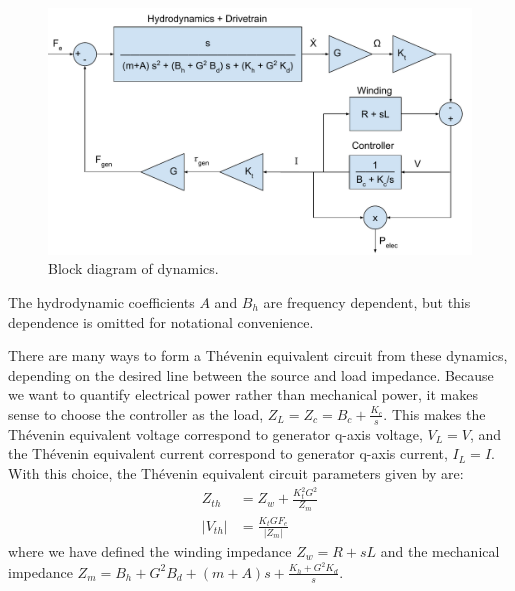 \documentclass{ifacconf}
\begin{document}
\begin{figure}
    \centering
    \includegraphics[width=\linewidth]{ifacconf_latex/figs/IFAC CAMS Dynamics Diagram - Electrical Control.pdf}
    \caption{Block diagram of dynamics.}
    \label{fig:block-diagram-dynamics}
\end{figure}
The hydrodynamic coefficients $A$ and $B_h$ are frequency dependent, but this dependence is omitted for notational convenience.

There are many ways to form a Thévenin equivalent circuit from these dynamics, depending on the desired line between the source and load impedance. Because we want to quantify electrical power rather than mechanical power, it makes sense to choose the controller as the load, $Z_L = Z_c = B_c + \frac{K_c}{s}$. This makes the Thévenin equivalent voltage correspond to generator q-axis voltage, $V_L = V$, and the Thévenin equivalent current correspond to generator q-axis current, $I_L = I$. With this choice, the Thévenin equivalent circuit parameters given by \cite{strofer_control_2023} are:
\begin{equation}\label{eq:thevenin}
\begin{aligned}
    Z_{th} &= Z_w + \frac{K_t^2 G^2}{Z_m} \\
    |V_{th}| &= \frac{K_t G F_e}{|Z_m|}
\end{aligned}
\end{equation}
where we have defined the winding impedance $Z_w = R + s L$ and the mechanical impedance $Z_m = B_h + G^2B_d + (m+A)s + \frac{K_h + G^2 K_d}{s}$.
\end{document}
